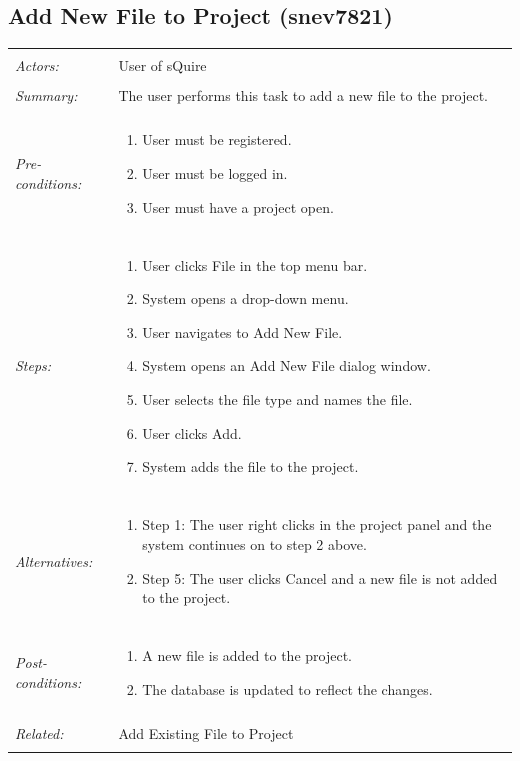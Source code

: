\documentclass[11pt]{report}
\begin{document}
\subsection{Add New File to Project (snev7821)}
\begin{tabular}{ p{2cm} p{12cm} }
\hline 
\\
 \textit{Actors:} & User of sQuire \\
 \\
 \textit{Summary:} & The user performs this task to add a new file to the project. \\
 \\
 \textit{Pre-conditions:} & \begin{enumerate}
  \item User must be registered.
  \item User must be logged in.
  \item User must have a project open.
 \end{enumerate} \\
 \\
 \textit{Steps:} & \begin{enumerate}
  \item User clicks File in the top menu bar.
  \item System opens a drop-down menu.
  \item User navigates to Add New File.
  \item System opens an Add New File dialog window.
  \item User selects the file type and names the file.
  \item User clicks Add.
  \item System adds the file to the project.
 \end{enumerate} \\
 \\
 \textit{Alternatives:} & \begin{enumerate}
  \item Step 1: The user right clicks in the project panel and the system continues on to step 2 above.
  \item Step 5: The user clicks Cancel and a new file is not added to the project.
 \end{enumerate} \\
 \\ 
 \textit{Post-conditions:} & \begin{enumerate}
  \item A new file is added to the project.
  \item The database is updated to reflect the changes.
 \end{enumerate} \\
 \\
 \textit{Related:} & Add Existing File to Project \\
 \\
\hline
\end{tabular} 
\newpage
\end{document}
